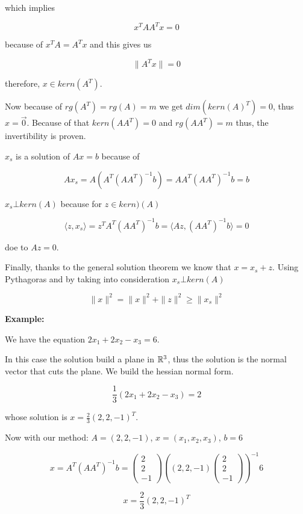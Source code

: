 which implies 

\[
	x^T AA^T x = 0
\] 

because of \(x^T A = A^T x\) and this gives us 

\[
	\|A^T x\| = 0
\] 

therefore, \(x \in kern(A^T)\).

Now because of \(rg(A^T) = rg(A) = m\) we get \(dim(kern(A)^T) = 0\), thus \(x = \vec{0}\). 
Because of that \(kern(A A^T) = 0\) and \(rg(AA^T) = m\) thus, the invertibility is proven.

\(x_s\) is a solution of \(Ax = b\) because of 

\[
	Ax_s = A(A^T {(A A^T)}^{-1} b) = AA^T {(A A^T)}^{-1} b = b
\]

\(x_s \bot kern(A)\) because for \(z \in kern)(A)\)

\[
	\langle z, x_s\rangle = z^T A^T {(A A^T)}^{-1} b = \langle Az, {(A A^T)}^{-1} b \rangle = 0
\]

doe to \(Az = 0\).

Finally, thanks to the general solution theorem we know that \(x = x_s + z\). Using Pythagoras and by 
taking into consideration \(x_s \bot kern(A)\)

\[
	\| x\|^2 = \|x\|^2 + \|z\|^2 \ge \|x_s\|^2
\]

\textbf{Example:}

We have the equation \(2x_1 + 2x_2 - x_3 = 6\).

In this case the solution build a plane in \(\mathbb{R}^3\), thus the solution is the normal vector that 
cuts the plane. We build the hessian normal form.

\[
	\frac{1}{3} (2x_1 + 2x_2 - x_3) = 2
\]

whose solution is \(x = \frac{2}{3}(2, 2, -1)^T\).

Now with our method: \(A = (2, 2, -1)\), \(x = (x_1, x_2, x_3)\), \(b = 6\)

\[
	x = A^T {(AA^T)}^{-1} b =
	\begin{pmatrix}
	2\\
	2\\
	-1
	\end{pmatrix}
	{\left(
		(2,2,-1)
	\begin{pmatrix}
	2\\
	2\\
	-1		
	\end{pmatrix}
	\right)}^{-1}
	6
\]

\[
	x = \frac{2}{3}(2, 2, -1)^T
\]

